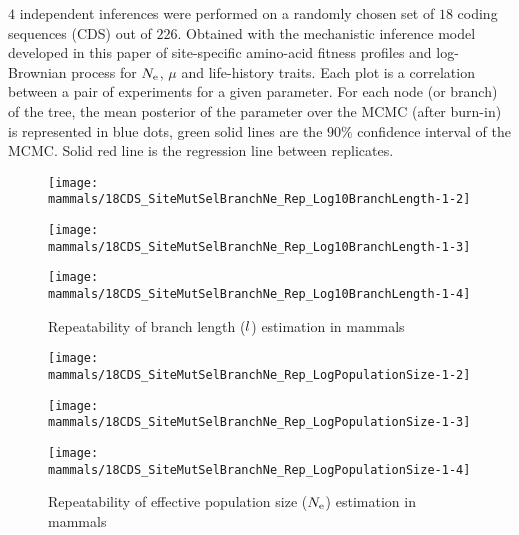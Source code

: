 $4$ independent inferences were performed on a randomly chosen set of $18$ coding sequences ({CDS}) out of $226$.
Obtained with the mechanistic inference model developed in this paper of site-specific amino-acid fitness profiles and log-Brownian process for $\Ne$, $\mu$ and life-history traits.
Each plot is a correlation between a pair of experiments for a given parameter.
For each node (or branch) of the tree, the mean {posterior} of the parameter over the {MCMC} (after burn-in) is represented in blue dots, green solid lines are the $90\%$ confidence interval of the {MCMC}.
Solid red line is the regression line between replicates.

\begin{figure}[H]
    \centering
    \begin{minipage}{0.32\linewidth}
        \texttt{[image: mammals/18CDS\_SiteMutSelBranchNe\_Rep\_Log10BranchLength-1-2]}
    \end{minipage} \hfill
    \begin{minipage}{0.32\linewidth}
        \texttt{[image: mammals/18CDS\_SiteMutSelBranchNe\_Rep\_Log10BranchLength-1-3]}
    \end{minipage} \hfill
    \begin{minipage}{0.32\linewidth}
        \texttt{[image: mammals/18CDS\_SiteMutSelBranchNe\_Rep\_Log10BranchLength-1-4]}
    \end{minipage}
    \caption[Repeatability of branch length estimation in mammals]{Repeatability of branch length ($l$) estimation in mammals}
\end{figure}

\begin{figure}[H]
    \centering
    \begin{minipage}{0.32\linewidth}
        \texttt{[image: mammals/18CDS\_SiteMutSelBranchNe\_Rep\_LogPopulationSize-1-2]}
    \end{minipage} \hfill
    \begin{minipage}{0.32\linewidth}
        \texttt{[image: mammals/18CDS\_SiteMutSelBranchNe\_Rep\_LogPopulationSize-1-3]}
    \end{minipage} \hfill
    \begin{minipage}{0.32\linewidth}
        \texttt{[image: mammals/18CDS\_SiteMutSelBranchNe\_Rep\_LogPopulationSize-1-4]}
    \end{minipage}
    \caption[Repeatability of $\Ne$ estimation in mammals]{Repeatability of {effective population size} ($\Ne$) estimation in mammals}
\end{figure}

